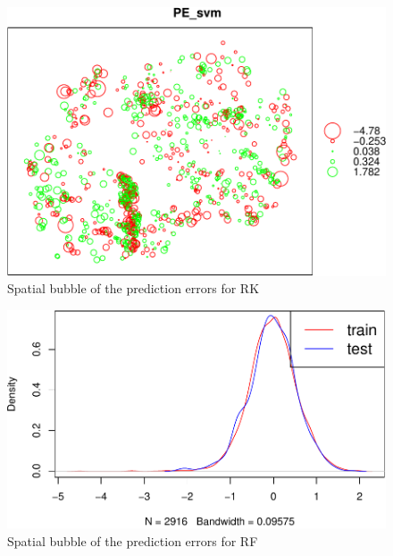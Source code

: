 \documentclass[10pt,b5paper,]{book}
\newenvironment{Shaded}{\begin{snugshade}}{\end{snugshade}}
\newcommand{\CommentTok}[1]{\textcolor[rgb]{0.56,0.35,0.01}{\textit{#1}}}
\newcommand{\DataTypeTok}[1]{\textcolor[rgb]{0.13,0.29,0.53}{#1}}
\newcommand{\DecValTok}[1]{\textcolor[rgb]{0.00,0.00,0.81}{#1}}
\newcommand{\KeywordTok}[1]{\textcolor[rgb]{0.13,0.29,0.53}{\textbf{#1}}}
\newcommand{\NormalTok}[1]{#1}
\newcommand{\OperatorTok}[1]{\textcolor[rgb]{0.81,0.36,0.00}{\textbf{#1}}}
\newcommand{\StringTok}[1]{\textcolor[rgb]{0.31,0.60,0.02}{#1}}
\theoremstyle{definition}
\theoremstyle{definition}
\theoremstyle{definition}
\theoremstyle{remark}
\begin{document}
\begin{figure}
\includegraphics[width=0.6\linewidth]{SOCMapping_files/figure-latex/unnamed-chunk-90-1} \caption{Spatial bubble of the prediction errors for RK}\label{fig:unnamed-chunk-90}
\end{figure}

\begin{Shaded}
\end{Shaded}

\begin{figure}
\includegraphics[width=0.6\linewidth]{SOCMapping_files/figure-latex/unnamed-chunk-91-1} \caption{Spatial bubble of the prediction errors for RF}\label{fig:unnamed-chunk-91}
\end{figure}

\begin{Shaded}
\end{Shaded}
\end{document}
